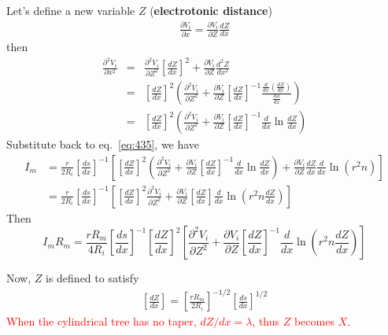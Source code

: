 Let's define a new variable $Z$ ({\bf electrotonic distance})
\begin{eqnarray}
  \label{eq:446}
  \frac{\partial V_i}{\partial x} = \frac{\partial V_i}{\partial Z} \frac{dZ}{dx}
\end{eqnarray}
then
\begin{eqnarray}
  \label{eq:497}
   \frac{\partial^2 V_i}{\partial x^2} &=& \frac{\partial^2 V_i}{\partial Z^2}
   \left[\frac{dZ}{dx}\right]^2 + \frac{\partial V_i}{\partial Z} \frac{d^2Z}{dx^2}
   \\
 &=& \left[\frac{dZ}{dx}\right]^2 \left( \frac{\partial^2 V_i}{\partial Z^2}
 + \frac{\partial V_i}{\partial Z}\left[\frac{dZ}{dx}\right]^{-1}
 \frac{\frac{d}{dx}\left(\frac{dZ}{dx}\right)}{\frac{dZ}{dx}}
\right)  \\
&=& \left[\frac{dZ}{dx}\right]^2 \left( \frac{\partial^2 V_i}{\partial Z^2}
 + \frac{\partial V_i}{\partial Z}\left[\frac{dZ}{dx}\right]^{-1}
 \frac{d}{dx}\ln\frac{dZ}{dx} \right)
\end{eqnarray}
Substitute back to eq.~\eqref{eq:435}, we have
\begin{equation}
  \label{eq:504}
  \begin{split}
    I_m &= \frac{r}{2R_i} \left[\frac{ds}{dx}\right]^{-1} \left[
      \left[\frac{dZ}{dx}\right]^2 \left(
        \frac{\partial^2 V_i}{\partial Z^2} +
        \frac{\partial V_i}{\partial Z}\left[\frac{dZ}{dx}\right]^{-1}
        \frac{d}{dx}\ln\frac{dZ}{dx} \right) +
      \frac{\partial V_i}{\partial
        Z} \frac{dZ}{dx} \frac{d}{dx}\ln(r^2n)\right] \\
    & = \frac{r}{2R_i} \left[\frac{ds}{dx}\right]^{-1} \left[
      \left[\frac{dZ}{dx}\right]^2 \frac{\partial^2 V_i}{\partial Z^2}
      + \frac{\partial V_i}{\partial Z}\left[\frac{dZ}{dx}\right]
      \frac{d}{dx}\ln\left( r^2n \frac{dZ}{dx} \right) \right] 
  \end{split}
\end{equation}
Then
\begin{equation}
  \label{eq:506}
  I_mR_m  = \frac{rR_m}{4R_i} \left[\frac{ds}{dx}\right]^{-1}
  \left[\frac{dZ}{dx}\right]^2 \left[ \frac{\partial^2
      V_i}{\partial
      Z^2}
    + \frac{\partial V_i}{\partial Z}\left[\frac{dZ}{dx}\right]^{-1}
    \frac{d}{dx}\ln\left( r^2n\frac{dZ}{dx} \right) \right]
\end{equation}


Now, $Z$ is defined to satisfy
\begin{eqnarray}
  \label{eq:505}
  \left[\frac{dZ}{dx}\right]= \left[\frac{rR_m}{2R_i}\right]^{-1/2} \left[\frac{ds}{dx}\right]^{1/2}
\end{eqnarray}
\textcolor{red}{When the cylindrical tree has no taper,
  $dZ/dx=\lambda$, thus $Z$ becomes $X$}.

